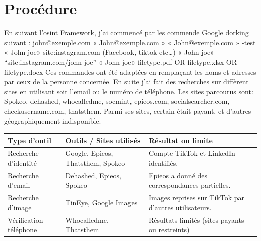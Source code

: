 \documentclass[french]{article}
\begin{document}
\section{Procédure}
En suivant l’osint Framework, j’ai commencé par les commende Google dorking suivant :
john@exemple.com
« John@exemple.com »
« John@exemple.com » -test
« John joe» site:instagram.com (Facebook, tiktok etc…)
« John joe»- “site:instagram.com/john joe”
« John joe» filetype.pdf OR filetype.xlsx OR filetype.docx
Ces commandes ont été adaptées en remplaçant les noms et adresses par ceux de la personne concernée.
En suite j’ai fait des recherches sur diffèrent sites en utilisant soit l’email ou le numéro de téléphone. Les sites parcourus sont: Spokeo, dehashed, whocalledme, socmint, epieos.com, socialsearcher.com, checkusername.com, thatsthem. Parmi ses sites, certain était payant, et d’autres géographiquement indisponible.
\vfill
\begin{tabular}{|l|l|l|}
	\hline
	Type d’outil & Outils / Sites utilisés & Résultat ou limite\\
	\hline
	Recherche d’identité & Google, Epieos, Thatsthem, Spokeo & Compte TikTok et LinkedIn identifiés.\\
	\hline
	Recherche d’email & Dehashed, Epieos, Spokeo & Epieos a donné des correspondances partielles.\\
	\hline
	Recherche d’image & TinEye, Google Images & Images reprises sur TikTok par d’autres utilisateurs.\\
	\hline
	Vérification téléphone & Whocalledme, Thatsthem & Résultats limités (sites payants ou restreints)\\
	\hline
\end{tabular}
\vfill
\end{document}
